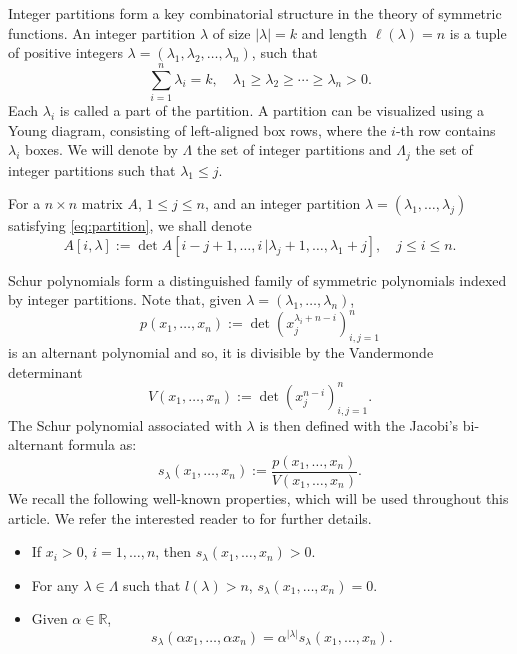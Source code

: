 \documentclass[smallextended]{svjour3}       %
\begin{document}
Integer partitions form a key combinatorial structure in the theory of symmetric functions. An integer partition \( \lambda \) of size \( |\lambda| = k \) and  length \( \ell(\lambda) = n \)  is a tuple of positive integers $\lambda = (\lambda_1, \lambda_2, \ldots, \lambda_n)$,  such that 
\begin{equation}\label{eq:partition}
  \sum_{i=1}^{n} \lambda_i = k,\quad  \lambda_1 \geq \lambda_2 \geq \cdots \geq \lambda_n > 0.
\end{equation}
Each \( \lambda_i \) is called a  part of the partition. A partition can be visualized using a Young diagram, consisting of left-aligned box rows, where the \( i \)-th row contains \( \lambda_i \) boxes.  We will denote by $\Lambda $ the set of integer partitions and  $\Lambda_j $ the set of integer partitions such that $\lambda_1\le j$.  

 For a $n\times n$ matrix $A$, $1\le j\le n$, and an integer partition $\lambda = (\lambda_1, \ldots, \lambda_j)$ satisfying \eqref{eq:partition}, 
 we shall denote
\[
       A{ [i,\lambda]}:=  \det A [i-j+1,\dots, i\,|\lambda_j+1,\dots,\lambda_1+j], \quad j \le i \le n. 
   \]
 
Schur polynomials form a distinguished family of symmetric polynomials indexed by integer partitions. Note that, given   \( \lambda = (\lambda_1, \ldots, \lambda_n) \),  
\[
p(x_1, \dots, x_n) := \det \left( x_j^{\lambda_i + n - i} \right)_{i,j=1}^n
\]  
is an alternant polynomial and so, it is divisible by  the Vandermonde determinant  
\begin{equation}\label{eq:V}
V(x_1, \ldots, x_n) := \det \left( x_j^{n-i} \right)_{i,j=1}^n.
\end{equation}
The Schur polynomial  associated with \( \lambda \) is then defined  with the Jacobi's bi-alternant formula as:  
\begin{equation}\label{schurdef}
s_\lambda(x_1, \dots, x_n) := \frac{ p(x_1, \dots, x_n) }{ V(x_1, \ldots, x_n)}.
\end{equation}  
We recall the following well-known properties, which will be used throughout this article. We refer the interested reader to \cite{Mac} for further details.
\begin{itemize}
    \item[i)] If  $x_i>0$, $i=1,\ldots,n$, then 
    \(s_\lambda(x_1,\ldots,x_{n}) > 0\).
    \item[ii)] For any \( \lambda\in \Lambda \) such that $l(\lambda) > n$,  
    \( s_\lambda(x_1,\ldots,x_{n}) = 0.\)
    \item[iii)] Given  $\alpha\in\mathbb R$,
    \[
        s_\lambda(\alpha x_1,   \ldots, \alpha x_{n}) = \alpha^{|\lambda|} s_\lambda(x_1,\ldots,x_{n}).
    \]
\end{itemize}
\end{document}
